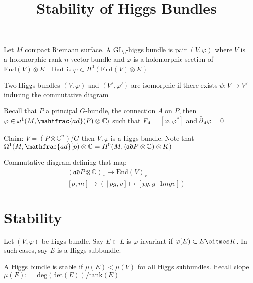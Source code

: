 % 

\title{Stability of Higgs Bundles}
\author{}
\date{}

 
\maketitle

\begin{definition}
Let $M$ compact Riemann surface. 
    A $\mathrm{GL}_n $-higgs bundle is pair $(V, \varphi)$ 
    where $ V$ is a holomorphic rank $n$ vector bundle and 
    $ \varphi$ is a holomorphic section of $ \mathrm{End}(V) \otimes K $.
    That is $ \varphi \in H^0 ( \mathrm{End} (V) \otimes K) $ 
\end{definition}

\begin{definition}
    Two Higgs bundles $(V, \varphi) $ and $(V', \varphi')$ are isomorphic if 
    there exists $ \psi: V \rightarrow  V'$ inducing the commutative diagram
\end{definition}

Recall that $P$ a principal $G$-bundle, 
the connection $A$ on $P$, then $ \varphi \in \omega^1 ( M , \mahtfrac{ad} ( P) \otimes \mathbb{C} ) $ 
such that $ F_ A = [ \varphi , \varphi ^* ] $ and $ \bar{\partial} _A \varphi = 0 $

Claim: $ V = (P \otimes \mathbb{C} ^n) / G $ then $V, \varphi$ is a higgs bundle. 
Note that $ \Omega^1 ( M, \mathfrac{ad} ( p) \otimes \mathbb{C}  = H^0 ( M , ( \mathfrak{ad} P \otimes \mathbb{C} ) \otimes K) $

Commutative diagram defining that map 
\begin{align}
    (\mathfrak{ad}P \otimes \mathbb{C} )_x  \rightarrow  \mathrm{End}(V) _x \\
    [p, m ] \mapsto ([pg, v] \mapsto [pg, g^-1 m g v] ) 
\end{align}


\section{Stability} %

\begin{definition}
    Let $( V, \varphi) $ be higgs bundle. 
    Say $ E \subset L$ is $ \varphi$ invariant if $ \varphi(E) \subset E \oitmes K$. 
    In such cases, say $E$ is a Higgs subbundle. 

    A Higgs bundle is stable if $\mu(E) < \mu(V) $ for all Higgs subbundles. 
    Recall slope $ \mu(E) : = \mathrm{deg} ( \mathrm{det}(E)) / \mathrm{rank}(E) $ 
\end{definition}


